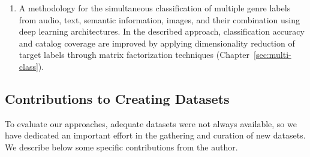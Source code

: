 \begin{enumerate}

\item 
A methodology for the simultaneous classification of multiple genre labels from audio, text, semantic information, images, and their combination using deep learning architectures. In the described approach, classification accuracy and catalog coverage are improved by applying dimensionality reduction of target labels through matrix factorization techniques (Chapter~\ref{sec:multi-class}). %

\end{enumerate}

\subsection{Contributions to Creating Datasets}

To evaluate our approaches, adequate datasets were not always available, so we have dedicated an important effort in the gathering and curation of new datasets. We describe below some specific contributions from the author. 

